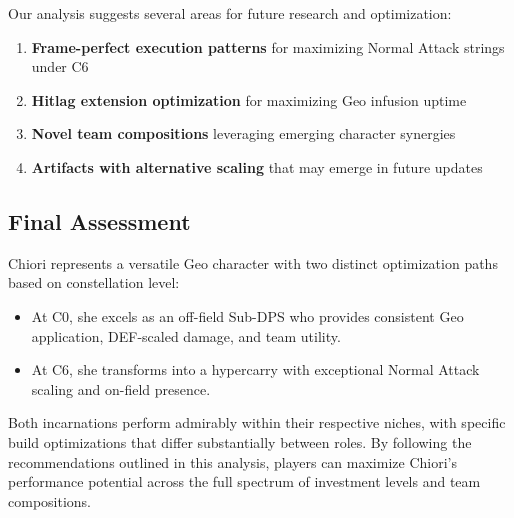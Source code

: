 \documentclass[12pt,a4paper]{article}
\begin{document}
Our analysis suggests several areas for future research and optimization:

\begin{enumerate}
    \item \textbf{Frame-perfect execution patterns} for maximizing Normal Attack strings under C6
    \item \textbf{Hitlag extension optimization} for maximizing Geo infusion uptime
    \item \textbf{Novel team compositions} leveraging emerging character synergies
    \item \textbf{Artifacts with alternative scaling} that may emerge in future updates
\end{enumerate}

\subsection{Final Assessment}

Chiori represents a versatile Geo character with two distinct optimization paths based on constellation level:

\begin{itemize}
    \item At C0, she excels as an off-field Sub-DPS who provides consistent Geo application, DEF-scaled damage, and team utility.
    \item At C6, she transforms into a hypercarry with exceptional Normal Attack scaling and on-field presence.
\end{itemize}

Both incarnations perform admirably within their respective niches, with specific build optimizations that differ substantially between roles. By following the recommendations outlined in this analysis, players can maximize Chiori's performance potential across the full spectrum of investment levels and team compositions.
\end{document}
